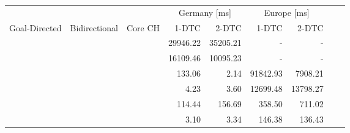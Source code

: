 \begin{tabular}{cccrrrrrr}
	\toprule
	              &               &         & \multicolumn{2}{c}{Germany [\si{\milli\second}]} & \multicolumn{2}{c}{Europe [\si{\milli\second}]}                 \\
	Goal-Directed & Bidirectional & Core CH & 1-DTC                                            & 2-DTC                                           & 1-DTC & 2-DTC \\
	\midrule
	\xmark        & \xmark        & \xmark  & 29946.22                                                & 35205.21                                               & -     & -     \\
	\xmark        & \cmark        & \xmark  & 16109.46                                                & 10095.23                                               & -     & -     \\
	\cmark        & \xmark        & \xmark  & 133.06                                                & 2.14                                               & 91842.93     & 7908.21     \\
	\cmark        & \cmark        & \xmark  & 4.23                                                & 3.60                                               & 12699.48     & 13798.27     \\
	\xmark        & \cmark        & \cmark  & 114.44                                                & 156.69                                               & 358.50     & 711.02     \\
	\cmark        & \cmark        & \cmark  & 3.10                                                & 3.34                                               & 146.38     & 136.43     \\
	\bottomrule
\end{tabular}